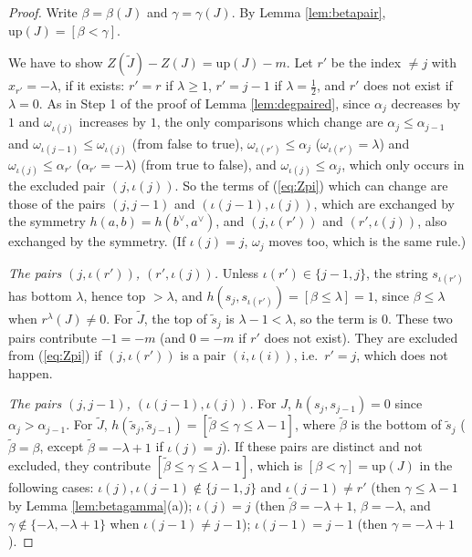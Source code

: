 \documentclass[a4paper,12pt,leqno]{amsart}
\theoremstyle{plain}
\theoremstyle{definition}
\begin{document}
\begin{proof}
Write $\beta=\beta(J)$ and $\gamma=\gamma(J)$. By Lemma \ref{lem:betapair}, $\mathrm{up}(J)=[\beta<\gamma]$.

We have to show $Z(\widetilde J)-Z(J)=\mathrm{up}(J)-m$. Let $r'$ be the index $\neq j$ with
$x_{r'}=-\lambda$, if it exists: $r'=r$ if $\lambda\geq1$, $r'=j-1$ if $\lambda=\tfrac12$, and $r'$
does not exist if $\lambda=0$. As in Step 1 of the proof of Lemma \ref{lem:degpaired}, since $\alpha_j$
decreases by $1$ and $\omega_{\iota(j)}$ increases by $1$, the only comparisons which change are
$\alpha_j\leq \alpha_{j-1}$ and $\omega_{\iota(j-1)}\leq \omega_{\iota(j)}$ (from false to true), $\omega_{\iota(r')}\leq \alpha_j$
($\omega_{\iota(r')}=\lambda$) and $\omega_{\iota(j)}\leq \alpha_{r'}$ ($\alpha_{r'}=-\lambda$) (from true to false), and
$\omega_{\iota(j)}\leq \alpha_j$, which only occurs in the excluded pair $(j,\iota(j))$. So the terms of
(\ref{eq:Zpi}) which can change are those of the pairs $(j,j-1)$ and $(\iota(j-1),\iota(j))$, which are
exchanged by the symmetry $h(a,b)=h(b^\vee,a^\vee)$, and $(j,\iota(r'))$ and $(r',\iota(j))$, also exchanged
by the symmetry. (If $\iota(j)=j$, $\omega_j$ moves too, which is the same rule.)

\emph{The pairs $(j,\iota(r'))$, $(r',\iota(j))$.} Unless $\iota(r')\in\{j-1,j\}$, the string $s_{\iota(r')}$ has
bottom $\lambda$, hence top $>\lambda$, and $h(s_j,s_{\iota(r')})=[\beta\leq\lambda]=1$, since $\beta\leq
\lambda$ when $r^\lambda(J)\neq0$. For $\widetilde J$, the top of $\widetilde s_j$ is $\lambda-1<\lambda$, so
the term is $0$. These two pairs contribute $-1=-m$ (and $0=-m$ if $r'$ does not exist). They are
excluded from (\ref{eq:Zpi}) if $(j,\iota(r'))$ is a pair $(i,\iota(i))$, i.e.\ $r'=j$, which does not
happen.

\emph{The pairs $(j,j-1)$, $(\iota(j-1),\iota(j))$.} For $J$, $h(s_j,s_{j-1})=0$ since $\alpha_j>\alpha_{j-1}$. For
$\widetilde J$, $h(\widetilde s_j,\widetilde s_{j-1})=[\widetilde\beta\leq\gamma\leq\lambda-1]$, where
$\widetilde\beta$ is the bottom of $\widetilde s_j$ ($\widetilde\beta=\beta$, except $\widetilde\beta=
-\lambda+1$ if $\iota(j)=j$). If these pairs are distinct and not excluded, they contribute
$[\widetilde\beta\leq\gamma\leq\lambda-1]$, which is $[\beta<\gamma]=\mathrm{up}(J)$ in the following
cases: $\iota(j),\iota(j-1)\notin\{j-1,j\}$ and $\iota(j-1)\neq r'$ (then $\gamma\leq\lambda-1$ by Lemma
\ref{lem:betagamma}(a)); $\iota(j)=j$ (then $\widetilde\beta=-\lambda+1$, $\beta=-\lambda$,
and $\gamma\notin\{-\lambda,-\lambda+1\}$ when $\iota(j-1)\neq j-1$); $\iota(j-1)=j-1$ (then
$\gamma=-\lambda+1$).


\end{proof}
\end{document}
